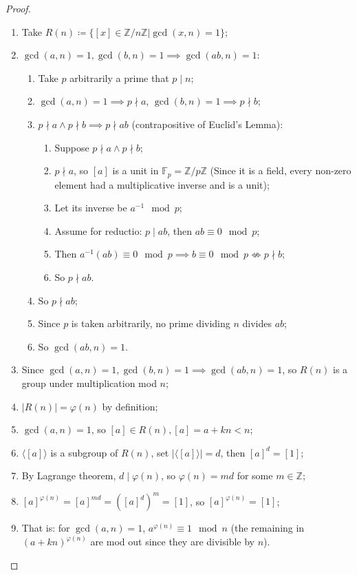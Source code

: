 \documentclass{article}
\begin{document}
\begin{proof}
    ~
    \begin{enumerate}
        \item Take $R(n)\coloneqq \{[x]\in\mathbb{Z}/n\mathbb{Z}|\gcd(x,n)=1\}$;
        \item $\gcd(a,n)=1,\gcd(b,n)=1\implies \gcd(ab,n)=1$:
        \begin{enumerate}
            \item Take $p$ arbitrarily a prime that $p\mid n$;
            \item $\gcd(a,n)=1\implies p\nmid a$, $\gcd(b,n)=1\implies p\nmid b$;
            \item $p\nmid a\land p\nmid b\implies p\nmid ab$ (contrapositive of Euclid's Lemma):
            \begin{enumerate}
                \item Suppose $p\nmid a\land p\nmid b$;
                \item $p\nmid a$, so $[a]$ is a unit in $\mathbb{F}_p=\mathbb{Z}/p\mathbb{Z}$ (Since it is a field, every non-zero element had a multiplicative inverse and is a unit);
                \item Let its inverse be $a^{-1}\mod{p}$;
                \item Assume for reductio: $p\mid ab$, then $ab\equiv 0\mod{p}$;
                \item Then $a^{-1}(ab)\equiv 0\mod{p}\implies b\equiv 0\mod{p}\nLeftrightarrow p\nmid b$;
                \item So $p\nmid ab$.
            \end{enumerate}
            \item So $p\nmid ab$;
            \item Since $p$ is taken arbitrarily, no prime dividing $n$ divides $ab$;
            \item So $\gcd(ab,n)=1$.
        \end{enumerate}
        \item Since $\gcd(a,n)=1,\gcd(b,n)=1\implies \gcd(ab,n)=1$, so $R(n)$ is a group under multiplication mod $n$;
        \item $|R(n)|=\varphi(n)$ by definition;
        \item $\gcd(a,n)=1$, so $[a]\in R(n),[a]=a+kn<n$;
        \item $\langle [a]\rangle $ is a subgroup of $R(n)$, set $|\langle [a]\rangle|=d$, then $[a]^d=[1]$;
        \item By Lagrange theorem, $d \mid\varphi(n)$, so $\varphi(n)=md$ for some $m\in \mathbb{Z}$;
        \item $[a]^{\varphi(n)}=[a]^{md}=([a]^d)^m=[1]$, so $[a]^{\varphi(n)}=[1]$;
        \item That is: for $\gcd(a,n)=1$, $a^{\varphi(n)}\equiv1\mod{n}$ (the remaining in $(a+kn)^{\varphi(n)}$ are mod out since they are divisible by $n$).
    \end{enumerate}
\end{proof}
\end{document}
